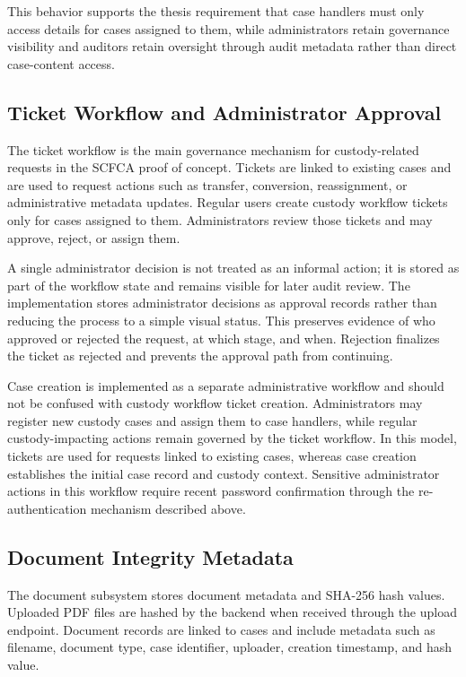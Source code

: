 \documentclass[12pt,a4paper]{report}
\begin{document}
This behavior supports the thesis requirement that case handlers must only access details for cases assigned to them, while administrators retain governance visibility and auditors retain oversight through audit metadata rather than direct case-content access.

\subsection{Ticket Workflow and Administrator Approval}

The ticket workflow is the main governance mechanism for custody-related requests in the SCFCA proof of concept. Tickets are linked to existing cases and are used to request actions such as transfer, conversion, reassignment, or administrative metadata updates. Regular users create custody workflow tickets only for cases assigned to them. Administrators review those tickets and may approve, reject, or assign them.

A single administrator decision is not treated as an informal action; it is stored as part of the workflow state and remains visible for later audit review. The implementation stores administrator decisions as approval records rather than reducing the process to a simple visual status. This preserves evidence of who approved or rejected the request, at which stage, and when. Rejection finalizes the ticket as rejected and prevents the approval path from continuing.

Case creation is implemented as a separate administrative workflow and should not be confused with custody workflow ticket creation. Administrators may register new custody cases and assign them to case handlers, while regular custody-impacting actions remain governed by the ticket workflow. In this model, tickets are used for requests linked to existing cases, whereas case creation establishes the initial case record and custody context. Sensitive administrator actions in this workflow require recent password confirmation through the re-authentication mechanism described above.

\subsection{Document Integrity Metadata}

The document subsystem stores document metadata and SHA-256 hash values. Uploaded PDF files are hashed by the backend when received through the upload endpoint. Document records are linked to cases and include metadata such as filename, document type, case identifier, uploader, creation timestamp, and hash value.
\end{document}
